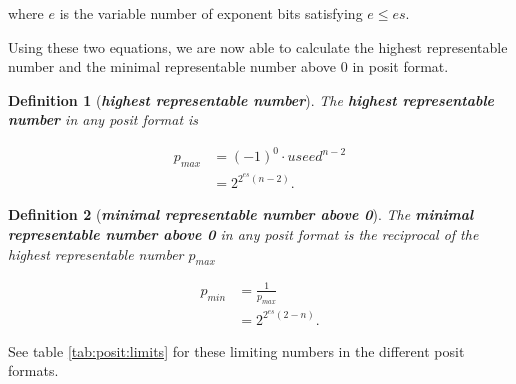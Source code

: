 \documentclass{article}
\theoremstyle{plain} %
\newtheorem{definition}{Definition}[section]
\theoremstyle{remark} %
\def\df#1{\textbf{\textit{#1}}}
\numberwithin{equation}{section}
\begin{document}
where $e$ is the variable number of exponent bits satisfying $e \le es$.

Using these two equations, we are now able to calculate the highest representable number and the minimal representable number above \num{0} in posit format.

\begin{definition}[\df{highest representable number}]

The \df{highest representable number} in any posit format is

\begin{align*}
    p_{max} &= (-1)^0 \cdot useed^{n-2} \\
            &= 2^{2^{es}(n-2)}.
\end{align*}

\end{definition}

\begin{definition}[\df{minimal representable number above \num{0}}]

The \df{minimal representable number above \num{0}} in any posit format is the reciprocal of the highest representable number $p_{max}$

\begin{align*}
    p_{min} &= \frac{1}{p_{max}} \\
            &= 2^{2^{es}(2-n)}.
\end{align*}

\end{definition}

See table \ref{tab:posit:limits} for these limiting numbers in the different posit formats.
\end{document}
